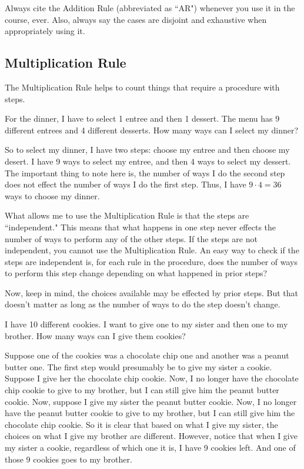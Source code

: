 \documentclass[11pt]{scrartcl}
\begin{document}
\begin{caveat}
Always cite the Addition Rule (abbreviated as ``AR") whenever you use it in the course, ever. Also, always say the cases are disjoint and exhaustive when appropriately using it.
\end{caveat}

\subsection{Multiplication Rule}
The Multiplication Rule helps to count things that require a procedure with steps.
\begin{example}
For the dinner, I have to select 1 entree and then 1 dessert. The menu has 9 different entrees and 4 different desserts. How many ways can I select my dinner?
\end{example}
So to select my dinner, I have two steps: choose my entree and then choose my desert. I have 9 ways to select my entree, and then 4 ways to select my dessert. The important thing to note here is, the number of ways I do the second step does not effect the number of ways I do the first step. Thus, I have $9 \cdot 4 = 36$ ways to choose my dinner.

What allows me to use the Multiplication Rule is that the steps are ``independent." This means that what happens in one step never effects the number of ways to perform any of the other steps. If the steps are not independent, you cannot use the Multiplication Rule. An easy way to check if the steps are independent is, for each rule in the procedure, does the number of ways to perform this step change depending on what happened in prior steps?

Now, keep in mind, the choices available may be effected by prior steps. But that doesn't matter as long as the number of ways to do the step doesn't change.
\begin{example}
I have 10 different cookies. I want to give one to my sister and then one to my brother. How many ways can I give them cookies?
\end{example}
Suppose one of the cookies was a chocolate chip one and another was a peanut butter one. The first step would presumably be to give my sister a cookie. Suppose I give her the chocolate chip cookie. Now, I no longer have the chocolate chip cookie to give to my brother, but I can still give him the peanut butter cookie. Now, suppose I give my sister the peanut butter cookie. Now, I no longer have the peanut butter cookie to give to my brother, but I can still give him the chocolate chip cookie. So it is clear that based on what I give my sister, the choices on what I give my brother are different. However, notice that when I give my sister a cookie, regardless of which one it is, I have 9 cookies left. And one of those 9 cookies goes to my brother.
\end{document}
